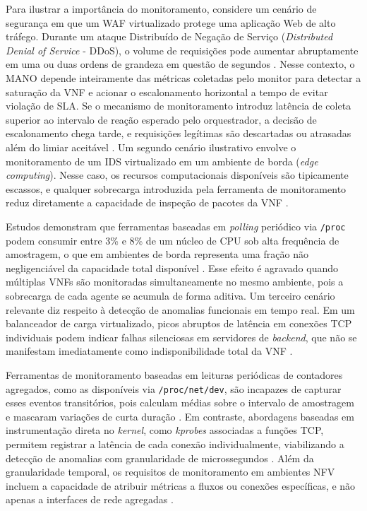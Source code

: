 Para ilustrar a importância do monitoramento, considere um cenário de segurança em que um WAF virtualizado protege uma aplicação Web de alto tráfego. Durante um ataque Distribuído de Negação de Serviço (\textit{Distributed Denial of Service} - DDoS), o volume de requisições pode aumentar abruptamente em uma ou duas ordens de grandeza em questão de segundos \cite{technologies12080122}. Nesse contexto, o MANO depende inteiramente das métricas coletadas pelo monitor para detectar a saturação da VNF e acionar o escalonamento horizontal a tempo de evitar violação de SLA. Se o mecanismo de monitoramento introduz latência de coleta superior ao intervalo de reação esperado pelo orquestrador, a decisão de escalonamento chega tarde, e requisições legítimas são descartadas ou atrasadas além do limiar aceitável \cite{oliveira_observability_2026, 10.23919}.
Um segundo cenário ilustrativo envolve o monitoramento de um IDS virtualizado em um ambiente de borda (\textit{edge computing}). Nesse caso, os recursos computacionais disponíveis são tipicamente escassos, e qualquer sobrecarga introduzida pela ferramenta de monitoramento reduz diretamente a capacidade de inspeção de pacotes da VNF \cite{10.1109/NOMS47738.2020.9110434}.

Estudos demonstram que ferramentas baseadas em \textit{polling} periódico via \texttt{/proc} podem consumir entre 3\% e 8\% de um núcleo de CPU sob alta frequência de amostragem, o que em ambientes de borda representa uma fração não negligenciável da capacidade total disponível \cite{10.1145/3452296.3472888}. Esse efeito é agravado quando múltiplas VNFs são monitoradas simultaneamente no mesmo ambiente, pois a sobrecarga de cada agente se acumula de forma aditiva.
Um terceiro cenário relevante diz respeito à detecção de anomalias funcionais em tempo real. Em um balanceador de carga virtualizado, picos abruptos de latência em conexões TCP individuais podem indicar falhas silenciosas em servidores de \textit{backend}, que não se manifestam imediatamente como indisponibilidade total da VNF \cite{epping2024rtt}.

Ferramentas de monitoramento baseadas em leituras periódicas de contadores agregados, como as disponíveis via \texttt{/proc/net/dev}, são incapazes de capturar esses eventos transitórios, pois calculam médias sobre o intervalo de amostragem e mascaram variações de curta duração \cite{godard2024sysstat}. Em contraste, abordagens baseadas em instrumentação direta no \textit{kernel}, como \textit{kprobes} associadas a funções TCP, permitem registrar a latência de cada conexão individualmente, viabilizando a detecção de anomalias com granularidade de microssegundos \cite{10.1109/NOMS47738.2020.9110434, epping2024rtt}.
Além da granularidade temporal, os requisitos de monitoramento em ambientes NFV incluem a capacidade de atribuir métricas a fluxos ou conexões específicas, e não apenas a interfaces de rede agregadas \cite{rfc9232}.

